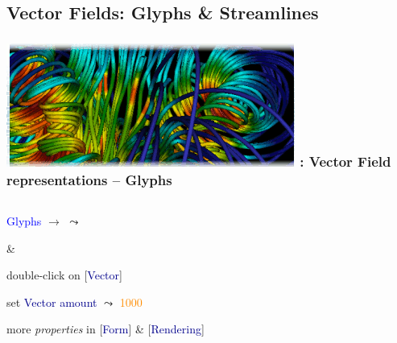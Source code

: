 \subsection{Vector Fields: Glyphs \& Streamlines}
\begin{frame}
\frametitle{\href{https://wci.llnl.gov/simulation/computer-codes/visit/}{\includegraphics[height=.85cm]{figs/visit-logos/VisIt-01}} \hspace{-.85cm}{\bf \textcolor{lightgray}{VisIt}}: Vector Field representations -- {Glyphs}}
\begin{columns}
\begin{column}{9cm}
\begin{beamerboxesrounded}[upper=block head,lower=block body,shadow=true]{\textcolor{DarkRed}{} \textcolor{blue}{Glyphs}}
	\textcolor{DarkBlue}{} 
			$\rightarrow$ \framebox{\bf \textcolor{DarkBlue}{Vector}}
			$\leadsto$ \framebox{\textcolor{DarkGreen}{\it airVfGradient}}

	\hspace{3.5mm}
		 \& 

	\vspace{2mm}
	\textcolor{DarkBlue}{} 
		double-click on [\textcolor{DarkBlue}{Vector}]

	\vspace{1.25mm}
	\hspace{3.5mm}
		set \textcolor{DarkBlue}{Vector amount} $\leadsto$ \textcolor{DarkOrange}{1000}

	\vspace{1.25mm}
	\hspace{3.5mm}
		more \textit{properties} in [\textcolor{DarkBlue}{Form}] \& [\textcolor{DarkBlue}{Rendering}]
\end{beamerboxesrounded}
\end{column}
\begin{column}{2.75cm}
\end{column}
\end{columns}
\end{frame}


